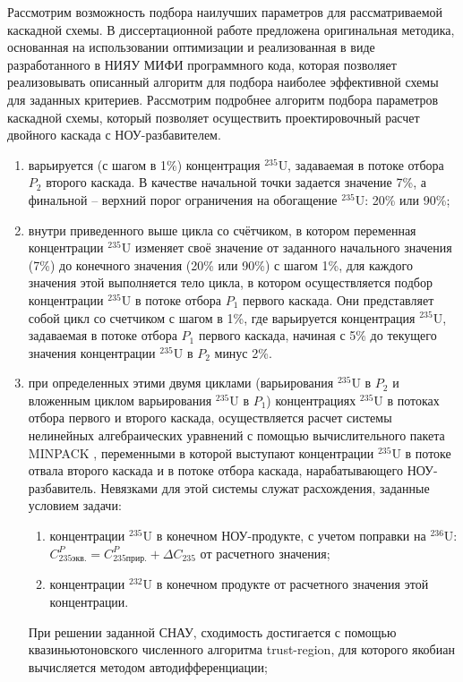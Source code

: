 Рассмотрим возможность подбора наилучших параметров для рассматриваемой каскадной схемы.
В диссертационной работе предложена оригинальная методика, основанная на использовании оптимизации и реализованная в виде разработанного в НИЯУ МИФИ программного кода, которая позволяет реализовывать описанный алгоритм для подбора наиболее эффективной схемы для заданных критериев.
Рассмотрим подробнее алгоритм подбора параметров каскадной схемы, который позволяет осуществить проектировочный расчет двойного каскада с НОУ-разбавителем.

\begin{enumerate}
    \item варьируется (с шагом в 1\%) концентрация $^{235}$U, задаваемая в потоке отбора $P_2$ второго каскада. В качестве начальной точки задается значение 7\%, а финальной -- верхний порог ограничения на обогащение $^{235}$U: 20\% или 90\%;
    \item внутри приведенного выше цикла со счётчиком, в котором переменная концентрации $^{235}$U изменяет своё значение от заданного начального значения (7\%) до конечного значения (20\% или 90\%) с шагом 1\%, для каждого значения этой выполняется тело цикла, в котором осуществляется подбор концентрации $^{235}$U в потоке отбора $P_1$ первого каскада. Они представляет собой цикл со счетчиком с шагом в 1\%, где варьируется концентрация $^{235}$U, задаваемая в потоке отбора $P_1$ первого каскада, начиная с 5\% до текущего значения концентрации $^{235}$U в $P_2$ минус 2\%.
    \item при определенных этими двумя циклами (варьирования $^{235}$U в $P_2$ и вложенным циклом варьирования $^{235}$U в $P_1$) концентрациях $^{235}$U в потоках отбора первого и второго каскада, осуществляется расчет системы нелинейных алгебраических уравнений с помощью вычислительного пакета MINPACK \cite{moreMINPACK}, переменными в которой выступают концентрации $^{235}$U в потоке отвала второго каскада и в потоке отбора каскада, нарабатывающего НОУ-разбавитель. Невязками для этой системы служат расхождения, заданные условием задачи:
    \begin{enumerate}
        \item концентрации $^{235}$U в  конечном НОУ-продукте, с учетом поправки на $^{236}$U: $C_{235 экв.}^{P}=C_{235 прир.}^{P}+\Delta C_{235}$ от расчетного значения;
        \item концентрации $^{232}$U в конечном продукте от расчетного значения этой концентрации.
    \end{enumerate}
    При решении заданной СНАУ, сходимость достигается с помощью квазиньютоновского численного алгоритма trust-region, для которого якобиан вычисляется методом автодифференциации;

\end{enumerate}

